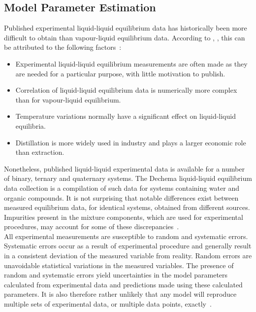 \subsection{Model Parameter Estimation} \label{ModelParameterEstimationSection}

Published experimental liquid-liquid equilibrium data has historically been more difficult to obtain than vapour-liquid equilibrium data. According to \citeauthor{LLERetrieval}, \citeyear{LLERetrieval}, this can be attributed to the following factors~\cite{LLERetrieval}:\

\begin{itemize}
\item Experimental liquid-liquid equilibrium measurements are often made as they are needed for a particular purpose, with little motivation to publish.\
\item Correlation of liquid-liquid equilibrium data is numerically more complex than for vapour-liquid equilibrium.\
\item Temperature variations normally have a significant effect on liquid-liquid equilibria.\
\item Distillation is more widely used in industry and plays a larger economic role than extraction.
\end{itemize}

Nonetheless, published liquid-liquid experimental data is available for a number of binary, ternary and quaternary systems. The Dechema liquid-liquid equilibrium data collection is a compilation of such data for systems containing water and organic compounds. It is not surprising that notable differences exist between measured equilibrium data, for identical systems, obtained from different sources. Impurities present in the mixture components, which are used for experimental procedures, may account for some of these discrepancies~\cite{EvaluationModelParameters, Dechema, LLERetrieval}.\\

All experimental measurements are susceptible to random and systematic errors. Systematic errors occur as a result of experimental procedure and generally result in a consistent deviation of the measured variable from reality. Random errors are unavoidable statistical variations in the measured variables. The presence of random and systematic errors yield uncertainties in the model parameters calculated from experimental data and predictions made using these calculated parameters. It is also therefore rather unlikely that any model will reproduce multiple sets of experimental data, or multiple data points, exactly~\cite{EvaluationModelParameters, ActivityCoefficientModelApplicationUNI, ActivityCoefficientModelApplicationNRTL}.\\

